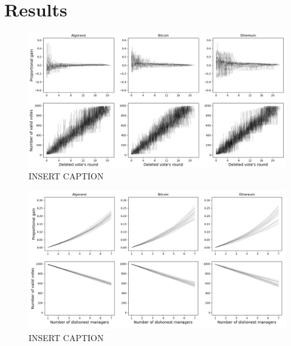 \section{Results}
\label{sec:results}







\begin{figure}[h]
	\centering
	\includegraphics[width=\linewidth]{img/deleter}
	\caption{INSERT CAPTION}
	\label{fig:deleter}
\end{figure}

\begin{figure}[h]
	\centering
	\includegraphics[width=\linewidth]{img/rejecter}
	\caption{INSERT CAPTION}
	\label{fig:rejecter}
\end{figure}